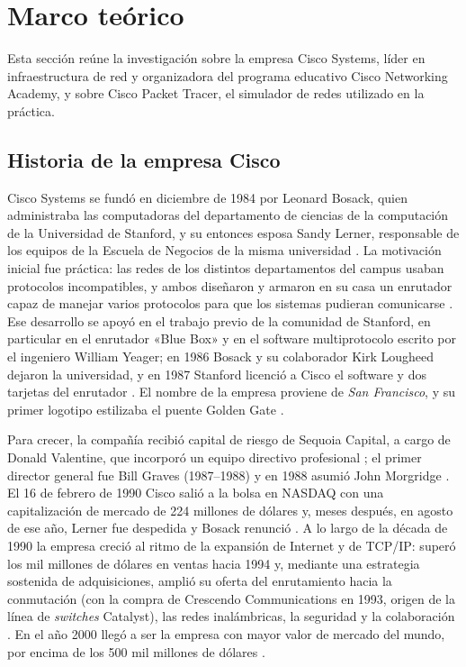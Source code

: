 \section{Marco teórico}
\label{sec:prac04:marco-teorico}

Esta sección reúne la investigación sobre la empresa Cisco Systems, líder en infraestructura de red y organizadora del programa educativo Cisco Networking Academy, y sobre Cisco Packet Tracer, el simulador de redes utilizado en la práctica.

\subsection{Historia de la empresa Cisco}
\label{sec:prac04:historia-cisco}

Cisco Systems se fundó en diciembre de 1984 por Leonard Bosack, quien administraba las computadoras del departamento de ciencias de la computación de la Universidad de Stanford, y su entonces esposa Sandy Lerner, responsable de los equipos de la Escuela de Negocios de la misma universidad \cite{wikipedia:cisco-systems, ebsco:cisco-systems}. La motivación inicial fue práctica: las redes de los distintos departamentos del campus usaban protocolos incompatibles, y ambos diseñaron y armaron en su casa un enrutador capaz de manejar varios protocolos para que los sistemas pudieran comunicarse \cite{wikipedia:leonard-bosack}. Ese desarrollo se apoyó en el trabajo previo de la comunidad de Stanford, en particular en el enrutador «Blue Box» y en el software multiprotocolo escrito por el ingeniero William Yeager; en 1986 Bosack y su colaborador Kirk Lougheed dejaron la universidad, y en 1987 Stanford licenció a Cisco el software y dos tarjetas del enrutador \cite{wikipedia:cisco-systems}. El nombre de la empresa proviene de \emph{San Francisco}, y su primer logotipo estilizaba el puente Golden Gate \cite{wikipedia:leonard-bosack}.

Para crecer, la compañía recibió capital de riesgo de Sequoia Capital, a cargo de Donald Valentine, que incorporó un equipo directivo profesional \cite{ebsco:cisco-systems}; el primer director general fue Bill Graves (1987--1988) y en 1988 asumió John Morgridge \cite{wikipedia:cisco-systems}. El 16 de febrero de 1990 Cisco salió a la bolsa en NASDAQ con una capitalización de mercado de 224 millones de dólares y, meses después, en agosto de ese año, Lerner fue despedida y Bosack renunció \cite{wikipedia:cisco-systems, ebsco:cisco-systems}. A lo largo de la década de 1990 la empresa creció al ritmo de la expansión de Internet y de TCP/IP: superó los mil millones de dólares en ventas hacia 1994 \cite{ebsco:cisco-systems} y, mediante una estrategia sostenida de adquisiciones, amplió su oferta del enrutamiento hacia la conmutación (con la compra de Crescendo Communications en 1993, origen de la línea de \emph{switches} Catalyst), las redes inalámbricas, la seguridad y la colaboración \cite{wikipedia:cisco-systems}. En el año 2000 llegó a ser la empresa con mayor valor de mercado del mundo, por encima de los 500 mil millones de dólares \cite{wikipedia:cisco-systems}.

